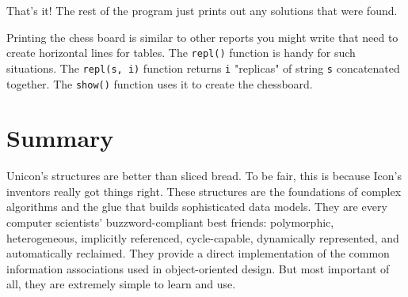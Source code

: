 That's it! The rest of the program just prints out any
solutions that were found.

Printing the chess board is similar to other reports you might write
that need to create horizontal lines for tables. The \texttt{repl()}
function is handy for such situations. The \texttt{repl(s, i)} function
returns \texttt{i} "replicas" of string
\texttt{s} concatenated together. The \texttt{show()} function uses it
to create the chessboard.\textit{ }


\section{Summary}

Unicon's structures are better than sliced bread. To be fair, this is because
Icon's inventors really got things right. These structures are the foundations
of complex algorithms and the glue that builds sophisticated data models. They
are every computer scientists' buzzword-compliant best friends: polymorphic,
heterogeneous, implicitly referenced, cycle-capable, dynamically represented,
and automatically reclaimed.  They provide a direct implementation of the common
information associations used in object-oriented design. But most important of
all, they are extremely simple to learn and use.
